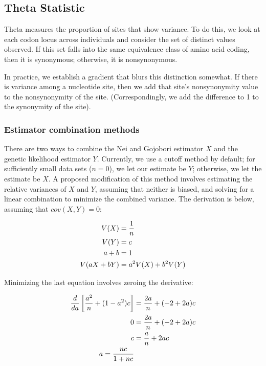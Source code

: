 \documentclass{article}
\begin{document}
    \subsection{Theta Statistic}
      \label{sec:theta-statistic}

      Theta measures the proportion of sites that show variance. To do this, we
      look at each codon locus across individuals and consider the set of
      distinct values observed. If this set falls into the same equivalence
      class of amino acid coding, then it is synonymous; otherwise, it is
      nonsynonymous.

      In practice, we establish a gradient that blurs this distinction somewhat.
      If there is variance among a nucleotide site, then we add that site's
      nonsynonymity value to the nonsynonymity of the site. (Correspondingly, we
	  add the difference to 1 to the synonymity of the site).

      \subsubsection{Estimator combination methods}
	\label{sec:variance-minimization}

	There are two ways to combine the Nei and Gojobori estimator $X$ and the
	genetic likelihood estimator $Y$. Currently, we use a cutoff method by
	default; for sufficiently small data sets ($n = 0$), we let our estimate
	be $Y$; otherwise, we let the estimate be $X$. A proposed modification
	of this method involves estimating the relative variances of $X$ and
	$Y$, assuming that neither is biased, and solving for a linear
	combination to minimize the combined variance. The derivation is below,
	assuming that $cov(X, Y) = 0$:

	\begin{align*}
	  V(X)		& = {1 \over n} \\ %
	  V(Y)		& = c \\ %
	  a + b 	& = 1 \\ %
	  V(aX + bY)	& = a^2 V(X) + b^2 V(Y)
	\end{align*}

	Minimizing the last equation involves zeroing the derivative:

	\begin{align*}
	  {d \over da} \left[{a^2 \over n} + (1 - a^2) c\right]
	    & = {2a \over n} + (-2 + 2a) c \\ %
	  0 & = {2a \over n} + (-2 + 2a) c \\ %
	  c & = {a \over n} + 2ac \\ %
	  a = {nc \over 1 + nc}
	\end{align*}
\end{document}
